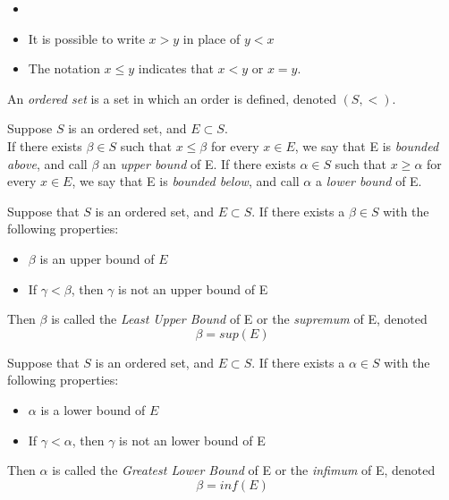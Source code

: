 \documentclass{report}
\begin{document}
			\begin{remark} \label{remark_order}
				\begin{itemize}
					\item[]
					\item It is possible to write $x>y$ in place of $y<x$
					\item The notation $x \leq y$ indicates that $x<y$ or $x=y$.
				\end{itemize}
			\end{remark}

		\begin{defn} \label{def_ordered_set}
			An \emph{ordered set} is a set in which an order is defined, denoted $(S,<)$.
		\end{defn}

		\begin{defn}[Bound] \label{def_bound}
			Suppose $S$ is an ordered set, and $E\subset S$.\\
			If there exists $\beta \in S$ such that $x \leq \beta$ for every $x \in E$, we say that E is \emph{bounded above}, and call $\beta$ an \emph{upper bound} of E.
			If there exists $\alpha \in S$ such that $x \geq \alpha$ for every $x \in E$, we say that E is \emph{bounded below}, and call $\alpha$ a \emph{lower bound} of E.
		\end{defn}

		\begin{defn} \label{def_supremum}
			Suppose that $S$ is an ordered set, and $E \subset S$.
			If there exists a $\beta \in S$ with the following properties:
			\begin{itemize}
				\item $\beta$ is an upper bound of $E$
				\item If $\gamma < \beta$, then $\gamma$ is not an upper bound of E
			\end{itemize}
			Then $\beta$ is called the \emph{Least Upper Bound} of E or the \emph{supremum} of E, denoted
			\begin{displaymath}
				\beta=sup(E)
			\end{displaymath}
		\end{defn}

		\begin{defn} \label{def_infimum}
			Suppose that $S$ is an ordered set, and $E \subset S$.
			If there exists a $\alpha \in S$ with the following properties:
			\begin{itemize}
				\item $\alpha$ is a lower bound of $E$
				\item If $\gamma < \alpha$, then $\gamma$ is not an lower bound of E
			\end{itemize}
			Then $\alpha$ is called the \emph{Greatest Lower Bound} of E or the \emph{infimum} of E, denoted
			\begin{displaymath}
			\beta=inf(E)
			\end{displaymath}
		\end{defn}
\end{document}

